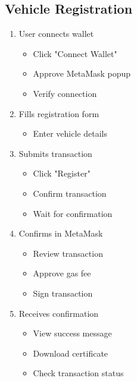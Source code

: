 \documentclass[12pt,a4paper]{article}
\begin{document}
    \subsection{Vehicle Registration}
    \begin{enumerate}
        \item User connects wallet
        \begin{itemize}
            \item Click "Connect Wallet"
            \item Approve MetaMask popup
            \item Verify connection
        \end{itemize}

        \item Fills registration form
        \begin{itemize}
            \item Enter vehicle details
        \end{itemize}

        \item Submits transaction
        \begin{itemize}
            \item Click "Register"
            \item Confirm transaction
            \item Wait for confirmation
        \end{itemize}

        \item Confirms in MetaMask
        \begin{itemize}
            \item Review transaction
            \item Approve gas fee
            \item Sign transaction
        \end{itemize}

        \item Receives confirmation
        \begin{itemize}
            \item View success message
            \item Download certificate
            \item Check transaction status
        \end{itemize}
    \end{enumerate}
\end{document}
